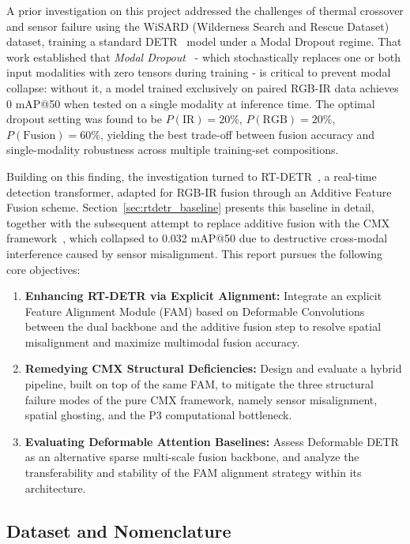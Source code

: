 \documentclass[12pt, a4paper]{article}
\begin{document}
A prior investigation on this project addressed the challenges of thermal crossover and sensor failure using the WiSARD (Wilderness Search and Rescue Dataset) dataset, training a standard DETR~\cite{carion2020detr} model under a Modal Dropout regime. That work established that \textit{Modal Dropout}~\cite{neverova2015moddrop} - which stochastically replaces one or both input modalities with zero tensors during training - is critical to prevent modal collapse: without it, a model trained exclusively on paired RGB-IR data achieves 0 mAP@50 when tested on a single modality at inference time. The optimal dropout setting was found to be $P(\text{IR}) = 20\%$, $P(\text{RGB}) = 20\%$, $P(\text{Fusion}) = 60\%$, yielding the best trade-off between fusion accuracy and single-modality robustness across multiple training-set compositions.

Building on this finding, the investigation turned to RT-DETR~\cite{xu2023rtdetr}, a real-time detection transformer, adapted for RGB-IR fusion through an Additive Feature Fusion scheme. Section~\ref{sec:rtdetr_baseline} presents this baseline in detail, together with the subsequent attempt to replace additive fusion with the CMX framework~\cite{zhang2023cmx}, which collapsed to 0.032 mAP@50 due to destructive cross-modal interference caused by sensor misalignment.
This report pursues the following core objectives:
\begin{enumerate}
    \item \textbf{Enhancing RT-DETR via Explicit Alignment:} Integrate an explicit Feature Alignment Module (FAM) based on Deformable Convolutions~\cite{zhu2019dcnv2} between the dual backbone and the additive fusion step to resolve spatial misalignment and maximize multimodal fusion accuracy.
    \item \textbf{Remedying CMX Structural Deficiencies:} Design and evaluate a hybrid pipeline, built on top of the same FAM, to mitigate the three structural failure modes of the pure CMX framework, namely sensor misalignment, spatial ghosting, and the P3 computational bottleneck.
    \item \textbf{Evaluating Deformable Attention Baselines:} Assess Deformable DETR~\cite{zhu2020deformable} as an alternative sparse multi-scale fusion backbone, and analyze the transferability and stability of the FAM alignment strategy within its architecture.
\end{enumerate}
 
\subsection{Dataset and Nomenclature}
\label{subsec:nomenclature}
 
\end{document}
